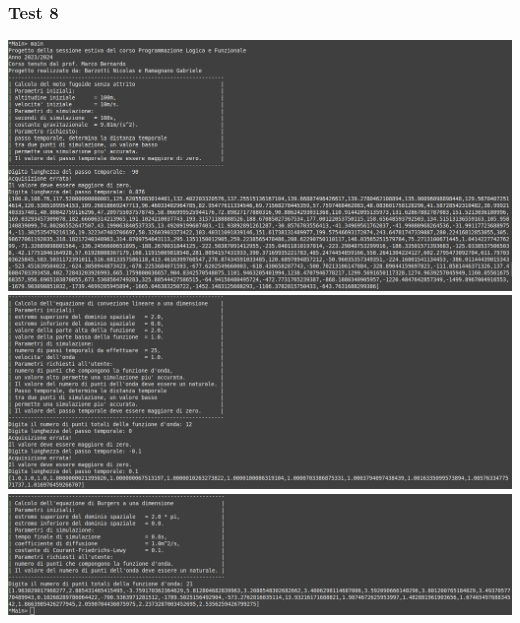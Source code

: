 \subsubsection*{Test 8}
\includegraphics[width=\textwidth,height=\textheight,keepaspectratio]{05_testing/image/hs/08_test/01_misto.png}
\\
\includegraphics[width=\textwidth,height=\textheight,keepaspectratio]{05_testing/image/hs/08_test/03_misto.png}
\\
\includegraphics[width=\textwidth,height=\textheight,keepaspectratio]{05_testing/image/hs/08_test/04_misto.png}

